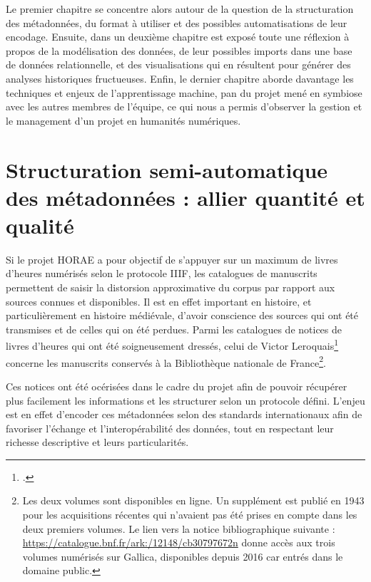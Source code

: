 \documentclass[a4paper,12pt,twoside]{book}
\begin{document}
Le premier chapitre se concentre alors autour de la question de la structuration des métadonnées, du format à utiliser et des possibles automatisations de leur encodage. Ensuite, dans un deuxième chapitre est exposé toute une réflexion à propos de la modélisation des données, de leur possibles imports dans une base de données relationnelle, et des visualisations qui en résultent pour générer des analyses historiques fructueuses. Enfin, le dernier chapitre aborde davantage les techniques et enjeux de l'apprentissage machine, pan du projet mené en symbiose avec les autres membres de l'équipe, ce qui nous a permis d'observer la gestion et le management d'un projet en humanités numériques. 

	
	\thispagestyle{empty}
	\cleardoublepage
	
	\mainmatter
	
	\chapter{\label{metadonnees}Structuration semi-automatique des métadonnées : allier quantité et qualité}
		
	Si le projet HORAE a pour objectif de s'appuyer sur un maximum de livres d'heures numérisés selon le protocole IIIF, les catalogues de manuscrits permettent de saisir la distorsion approximative du corpus par rapport aux sources connues et disponibles. Il est en effet important en histoire, et particulièrement en histoire médiévale, d'avoir conscience des sources qui ont été transmises et de celles qui on été perdues. Parmi les catalogues de notices de livres d'heures qui ont été soigneusement dressés, celui de Victor Leroquais\footcite{Leroquais_notices} concerne les manuscrits conservés à la Bibliothèque nationale de France\footnote{ Les deux volumes sont disponibles en ligne. Un supplément est publié en 1943 pour les acquisitions récentes qui n'avaient pas été prises en compte dans les deux premiers volumes. Le lien vers la notice bibliographique suivante : \url{https://catalogue.bnf.fr/ark:/12148/cb30797672n} donne accès aux trois volumes numérisés sur Gallica, disponibles depuis 2016 car entrés dans le domaine public.}. 
	
	Ces notices ont été océrisées dans le cadre du projet afin de pouvoir récupérer plus facilement les informations et les structurer selon un protocole défini. L'enjeu est en effet d'encoder ces métadonnées selon des standards internationaux afin de favoriser l'échange et l'interopérabilité des données, tout en respectant leur richesse descriptive et leurs particularités. 
	
\end{document}
